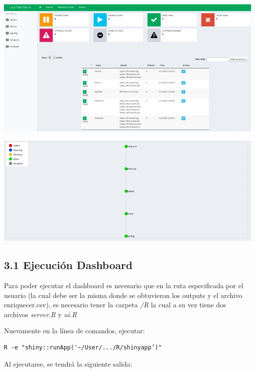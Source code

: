 \documentclass[]{article}
\begin{document}
\begin{center}\includegraphics{entregable-analisis_clickstream_files/figure-latex/unnamed-chunk-2-1} \end{center}

\begin{center}\includegraphics{entregable-analisis_clickstream_files/figure-latex/unnamed-chunk-3-1} \end{center}

\subsection{3.1 Ejecución Dashboard}\label{ejecucion-dashboard}

Para poder ejecutar el dashboard es necesario que en la ruta
especificada por el usuario (la cual debe ser la misma donde se
obtuvieron los outputs y el archivo enriquecer.csv), es necesario tener
la carpeta \emph{/R} la cual a su vez tiene dos archivos \emph{server.R}
y \emph{ui.R}

Nuevamente en la línea de comandos, ejecutar:

\begin{verbatim}
R -e "shiny::runApp('~/User/.../R/shinyapp’)"
\end{verbatim}

Al ejecutarse, se tendrá la siguiente salida:
\end{document}
